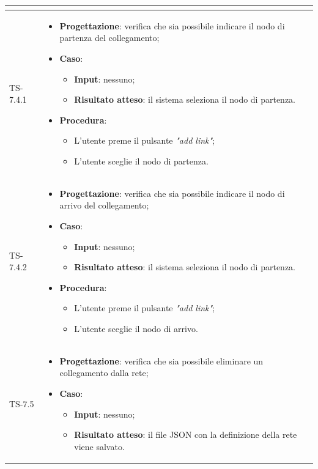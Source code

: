 \begin{longtable}{|C{2.5cm}|C{13cm}|}
\begin{itemize}
\end{itemize}\\
\hline
	{TS-7.4.1} & 
\begin{itemize}
	\item \textbf{Progettazione}: verifica che sia possibile indicare il nodo
	di partenza del collegamento;
	\item \textbf{Caso}: 
	\begin{itemize}
		\item \textbf{Input}: nessuno;
		\item \textbf{Risultato atteso}: il sistema seleziona il nodo di partenza.
	\end{itemize}
	\item \textbf{Procedura}:
	\begin{itemize}
		\item L'utente preme il pulsante \emph{"add link"};
		\item L'utente sceglie il nodo di partenza.
	\end{itemize} 
\end{itemize}
	 \\
	\hline
	{TS-7.4.2} &
\begin{itemize}
	\item \textbf{Progettazione}: verifica che sia possibile indicare il nodo
	di arrivo del collegamento;
	\item \textbf{Caso}: 
	\begin{itemize}
		\item \textbf{Input}: nessuno;
		\item \textbf{Risultato atteso}: il sistema seleziona il nodo di partenza.
	\end{itemize}
	\item \textbf{Procedura}:
	\begin{itemize}
		\item L'utente preme il pulsante \emph{"add link"};
		\item L'utente sceglie il nodo di arrivo.
	\end{itemize} 
\end{itemize}
\\
\hline
	{TS-7.5} &
\begin{itemize}
	\item \textbf{Progettazione}: verifica che sia possibile eliminare un
	collegamento dalla rete;
	\item \textbf{Caso}: 
	\begin{itemize}
		\item \textbf{Input}: nessuno;
		\item \textbf{Risultato atteso}: il file JSON con la definizione della rete viene salvato.

\end{itemize}
\end{itemize}
\end{longtable}
